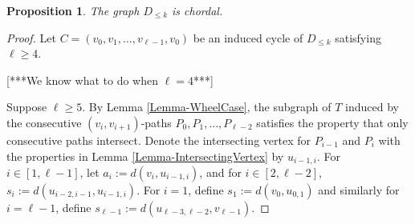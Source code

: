 \documentclass[12pt]{article}
\newtheorem{prop}[thm]{Proposition}
\theoremstyle{definition}
\begin{document}
	\begin{prop}
		The graph $D_{\leq k}$ is chordal.
	\end{prop}
	\begin{proof}
		Let $C = (v_0,v_1, \ldots, v_{\ell-1},v_0)$ be an induced cycle of $D_{\leq k}$ satisfying $\ell \geq 4$.  
		
		[***We know what to do when $\ell = 4$***]
		
		Suppose $\ell \geq 5$.  By Lemma \ref{Lemma-WheelCase}, the subgraph of $T$ induced by the consecutive $(v_i,v_{i+1})$-paths $P_0,P_1, \ldots, P_{\ell-2}$ satisfies the property that only consecutive paths intersect. Denote the intersecting vertex for $P_{i-1}$ and $P_{i}$ with the properties in Lemma \ref{Lemma-IntersectingVertex} by $u_{i-1,i}$.  For $i \in [1,\ell-1]$, let $a_i := d(v_{i}, u_{i-1,i})$, and for $i \in [2,\ell-2]$, $s_i := d(u_{i-2,i-1}, u_{i-1,i})$.  For $i = 1$, define $s_1 := d(v_0,u_{0,1})$ and similarly for $i = \ell-1$, define $s_{\ell-1} := d(u_{\ell-3,\ell-2}, v_{\ell-1})$.
		

\end{proof}
\end{document}
